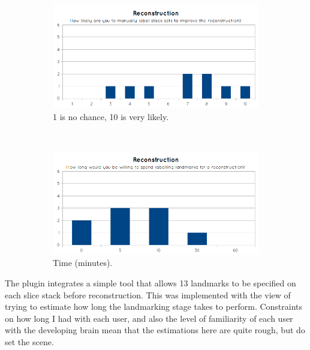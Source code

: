 \begin{figure}[H]
  \centering
  \begin{subfigure}[b]{0.5\textwidth}
    \includegraphics[width=\textwidth]{images/evaluation/graph_reconstruction_2.png}
    \caption{1 is no chance, 10 is very likely.}
    \label{fig:graph_reconstruction_2}
  \end{subfigure}%
  ~ %
  \begin{subfigure}[b]{0.5\textwidth}
    \includegraphics[width=\textwidth]{images/evaluation/graph_reconstruction_3.png}
    \caption{Time (minutes).}
    \label{fig:graph_reconstruction_3}
  \end{subfigure}
  \caption{}\label{fig:graph_reconstruction23}
\end{figure}

The plugin integrates a simple tool that allows 13 landmarks to be specified on each slice stack before reconstruction. This was implemented with the view of trying to estimate how long the landmarking stage takes to perform. Constraints on how long I had with each user, and also the level of familiarity of each user with the developing brain mean that the estimations here are quite rough, but do set the scene.

